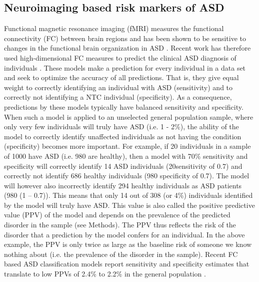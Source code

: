 \documentclass[9pt,lineno]{elife}
\begin{document}
\subsection{Neuroimaging based risk markers of ASD}
Functional magnetic resonance imaging (fMRI) measures the functional connectivity (FC) between brain regions and has been shown to be sensitive to changes in the functional brain organization in ASD \citep{Castellanos2013-tw,Holiga2019-ub}. Recent work has therefore used high-dimensional FC measures to predict the clinical ASD diagnosis of individuals \citep{Abraham2017-vf,Heinsfeld2018-yl,Yahata2016-jk}. These models make a prediction for every individual in a data set and seek to optimize the accuracy of all predictions. That is, they give equal weight to correctly identifying an individual with ASD (sensitivity) and to correctly not identifying a NTC individual (specificity). As a consequence, predictions by these models typically have balanced sensitivity and specificity. When such a model is applied to an unselected general population sample, where only very few individuals will truly have ASD (i.e. 1 - 2\%), the ability of the model to correctly identify unaffected individuals as not having the condition (specificity) becomes more important. For example, if 20 individuals in a sample of 1000 have ASD (i.e. 980 are healthy), then a model with 70\% sensitivity and specificity will correctly identify 14 ASD individuals (20sensitivity of 0.7) and correctly not identify 686 healthy individuals (980  specificity of 0.7). The model will however also incorrectly identify 294 healthy individuals as ASD patients (980 (1 – 0.7)). This means that only 14 out of 308 (or 4\%) individuals identified by the model will truly have ASD. This value is also called the positive predictive value (PPV) of the model and depends on the prevalence of the predicted disorder in the sample (see Methods). The PPV thus reflects the risk of the disorder that a prediction by the model confers for an individual. In the above example, the PPV is only twice as large as the baseline risk of someone we know nothing about (i.e. the prevalence of the disorder in the sample). Recent FC based ASD classification models report sensitivity and specificity estimates that translate to low PPVs of 2.4\% to 2.2\% in the general population \citep{Abraham2017-vf,Heinsfeld2018-yl}.
\end{document}
